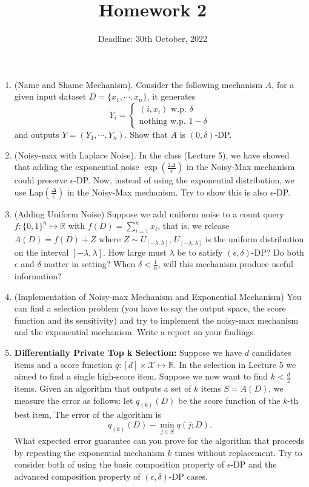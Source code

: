 \documentclass[11pt]{article}
\date{\displaydate{date}}
\begin{document}
\author{Deadline: 30th October, 2022}
\title{Homework 2}
\maketitle

\medskip

\begin{enumerate}
\item (Name and Shame Mechanism). Consider the following mechanism $A$, for a given input dataset $D=\{x_1, \cdots, x_n\}$, it generates 
 \begin{equation}
 	Y_i=\begin{cases}
 		(i, x_i) \text{ w.p. } \delta \\
 		\text{nothing} \text{ w.p. } 1-\delta
 	\end{cases}
 \end{equation}
	and outputs $Y=(Y_1, \cdots, Y_n)$. 
Show that $A$ is $(0, \delta)$-DP. 
\item (Noisy-max with Laplace Noise). In the class (Lecture 5), we have showed that adding the exponential noise $\exp(\frac{2\Delta}{\epsilon})$ in the Noisy-Max mechanism could preserve $\epsilon$-DP. Now, instead of using the exponential distribution, we use $\text{Lap}(\frac{\Delta}{\epsilon})$ in the Noisy-Max mechanism. Try to show this is also $\epsilon$-DP. 
\item (Adding Uniform Noise) Suppose we add uniform noise to a count query $f: \{0, 1\}^n\mapsto \mathbb{R}$ with $f(D)=\sum_{i=1}^n x_i$, that is, we release $A(D)=f(D)+Z$ where $Z\sim U_{[-\lambda, \lambda]}$, $U_{[-\lambda, \lambda]}$ is the uniform distribution on the interval $[-\lambda, \lambda]$.  How large must $\lambda$ be to satisfy $(\epsilon, \delta)$-DP? Do both $\epsilon$ and $\delta$ matter in setting?
When $\delta<\frac{1}{n}$, will this mechanism produce useful information?
\item (Implementation of Noisy-max Mechanism and Exponential Mechanism) You can find a selection problem (you have to say the output space, the score function and its sensitivity) and try to implement the noisy-max mechanism and the exponential mechanism. Write a report on your findings.  
\item {\bf Differentially Private Top k Selection:} Suppose we have $d$ candidates items and a score function $q: [d]\times \mathcal{X}\mapsto \mathbb{R}$. In the selection in Lecture 5 we aimed to find a single high-score item. Suppose we now want to find $k<\frac{d}{2}$ items. Given an algorithm that outputs a set of $k$ items $S=A(D)$, we measure the error as follows: let $q_{(k)}(D)$ be the score function of the $k$-th best item, The error of the algorithm is 
 \begin{equation}
	q_{(k)}(D)-\min_{j\in S}q(j; D). 
\end{equation}
What expected error guarantee can you prove for the algorithm that proceeds by repeating the
exponential mechanism $k$ times  without replacement. Try to consider both of using the basic composition property of $\epsilon$-DP and the advanced composition property of $(\epsilon,\delta)$-DP cases. 


\end{enumerate}
\end{document}
